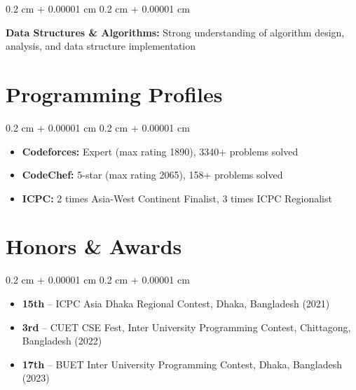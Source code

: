 \documentclass[10pt, letterpaper]{article}
\newenvironment{highlightsforbulletentries}{
    \begin{itemize}[
        topsep=0.10 cm,
        parsep=0.10 cm,
        partopsep=0pt,
        itemsep=0pt,
        leftmargin=10pt
    ]
}{
    \end{itemize}
} %
\newenvironment{onecolentry}{
    \begin{adjustwidth}{
        0.2 cm + 0.00001 cm
    }{
        0.2 cm + 0.00001 cm
    }
}{
    \end{adjustwidth}
} %
\begin{document}
        \vspace{0.2 cm}

        \begin{onecolentry}
            \textbf{Data Structures \& Algorithms:} Strong understanding of algorithm design, analysis, and data structure implementation
        \end{onecolentry}

    \section{Programming Profiles}

        \begin{onecolentry}
            \begin{highlightsforbulletentries}
                \item \textbf{Codeforces:} Expert (max rating 1890), 3340+ problems solved
                \item \textbf{CodeChef:} 5-star (max rating 2065), 158+ problems solved
                \item \textbf{ICPC:} 2 times Asia-West Continent Finalist, 3 times ICPC Regionalist
            \end{highlightsforbulletentries}
        \end{onecolentry}

    \section{Honors \& Awards}

        \begin{onecolentry}
            \begin{highlightsforbulletentries}
                \item \textbf{15th} -- ICPC Asia Dhaka Regional Contest, Dhaka, Bangladesh (2021)
                \item \textbf{3rd} -- CUET CSE Fest, Inter University Programming Contest, Chittagong, Bangladesh (2022)
                \item \textbf{17th} -- BUET Inter University Programming Contest, Dhaka, Bangladesh (2023)
            \end{highlightsforbulletentries}
        \end{onecolentry}
\end{document}
